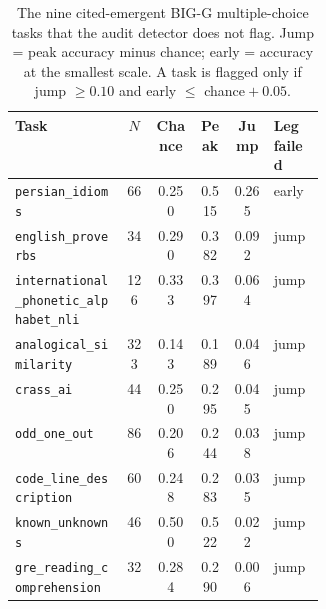 \documentclass[11pt]{article}
\theoremstyle{plain}
\theoremstyle{definition}
\begin{document}
\begin{table}[htbp]
\centering
\caption{The nine cited-emergent BIG-G multiple-choice tasks that the audit detector does
not flag. Jump = peak accuracy minus chance; early = accuracy at the smallest scale.
A task is flagged only if jump ${\geq}0.10$ and early ${\leq}$ chance${}+0.05$.}
\label{tab:bigbench-falsenegative}
\footnotesize
\begin{tabular}{>{\raggedright\arraybackslash}p{0.36\linewidth}ccccl}
\toprule
Task & $N$ & Chance & Peak & Jump & Leg failed \\
\midrule
\texttt{persian\_idioms}         & 66  & 0.250 & 0.515 & 0.265 & early \\
\texttt{english\_proverbs}       & 34  & 0.290 & 0.382 & 0.092 & jump \\
\texttt{international\_phonetic\_}\newline\texttt{alphabet\_nli}
                                 & 126 & 0.333 & 0.397 & 0.064 & jump \\
\texttt{analogical\_similarity}  & 323 & 0.143 & 0.189 & 0.046 & jump \\
\texttt{crass\_ai}               & 44  & 0.250 & 0.295 & 0.045 & jump \\
\texttt{odd\_one\_out}           & 86  & 0.206 & 0.244 & 0.038 & jump \\
\texttt{code\_line\_description} & 60  & 0.248 & 0.283 & 0.035 & jump \\
\texttt{known\_unknowns}         & 46  & 0.500 & 0.522 & 0.022 & jump \\
\texttt{gre\_reading\_comprehension} & 32 & 0.284 & 0.290 & 0.006 & jump \\
\bottomrule
\end{tabular}
\end{table}
\end{document}
